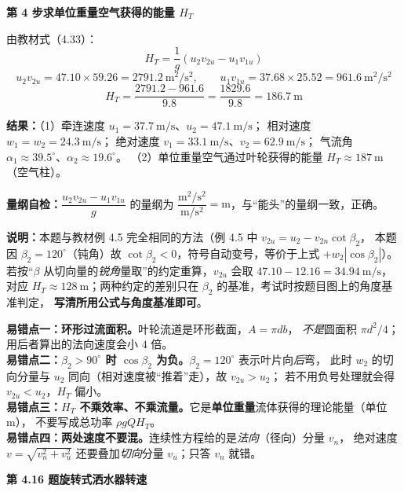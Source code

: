 \begin{jie}
\textbf{第 4 步\quad 求单位重量空气获得的能量 $H_T$}

由教材式（4.33）：
\[ H_T=\frac{1}{g}\left(u_2v_{2u}-u_1v_{1u}\right) \]
\[ u_2v_{2u}=47.10\times59.26=2791.2\ \mathrm{m^2/s^2},\qquad
   u_1v_{1u}=37.68\times25.52=961.6\ \mathrm{m^2/s^2} \]
\[ H_T=\frac{2791.2-961.6}{9.8}=\frac{1829.6}{9.8}=186.7\ \mathrm{m} \]

\textbf{结果：}（1）牵连速度 $u_1=37.7\ \mathrm{m/s}$、$u_2=47.1\ \mathrm{m/s}$；
相对速度 $w_1=w_2=24.3\ \mathrm{m/s}$；
绝对速度 $v_1=33.1\ \mathrm{m/s}$、$v_2=62.9\ \mathrm{m/s}$；
气流角 $\alpha_1\approx39.5^\circ$、$\alpha_2\approx19.6^\circ$。
（2）单位重量空气通过叶轮获得的能量 $H_T\approx187\ \mathrm{m}$（空气柱）。

\textbf{量纲自检：}$\dfrac{u_2v_{2u}-u_1v_{1u}}{g}$ 的量纲为
$\dfrac{\mathrm{m^2/s^2}}{\mathrm{m/s^2}}=\mathrm{m}$，与“能头”的量纲一致，正确。

\textbf{说明：}本题与教材例 4.5 完全相同的方法（例 4.5 中 $v_{2u}=u_2-v_{2n}\cot\beta_2$，
本题因 $\beta_2=120^\circ$（钝角）故 $\cot\beta_2<0$，符号自动变号，等价于上式 $+w_2|\cos\beta_2|$）。
若按“$\beta$ 从切向量的\emph{锐角}量取”的约定重算，$v_{2u}$ 会取 $47.10-12.16=34.94\ \mathrm{m/s}$，
对应 $H_T\approx128\ \mathrm{m}$；两种约定的差别只在 $\beta_2$ 的基准，考试时按题目图上的角度基准判定，
\textbf{写清所用公式与角度基准即可}。
\end{jie}

\begin{yicuo}
\textbf{易错点一：环形过流面积。}叶轮流道是环形截面，$A=\pi db$，
\emph{不是}圆面积 $\pi d^2/4$；用后者算出的法向速度会小 $4$ 倍。\\
\textbf{易错点二：$\beta_2>90^\circ$ 时 $\cos\beta_2$ 为负。}$\beta_2=120^\circ$ 表示叶片向\emph{后}弯，
此时 $w_2$ 的切向分量与 $u_2$ 同向（相对速度被“推着”走），故 $v_{2u}>u_2$；
若不用负号处理就会得 $v_{2u}<u_2$，$H_T$ 偏小。\\
\textbf{易错点三：$H_T$ 不乘效率、不乘流量。}它是\textbf{单位重量}流体获得的理论能量（单位 m），
不要写成总功率 $\rho gQH_T$。\\
\textbf{易错点四：两处速度不要混。}连续性方程给的是\emph{法向}（径向）分量 $v_n$，
绝对速度 $v=\sqrt{v_n^2+v_u^2}$ 还要叠加\emph{切向}分量 $v_u$；只答 $v_n$ 就错。
\end{yicuo}

\noindent\textbf{第 4.16 题\quad 旋转式洒水器转速}

